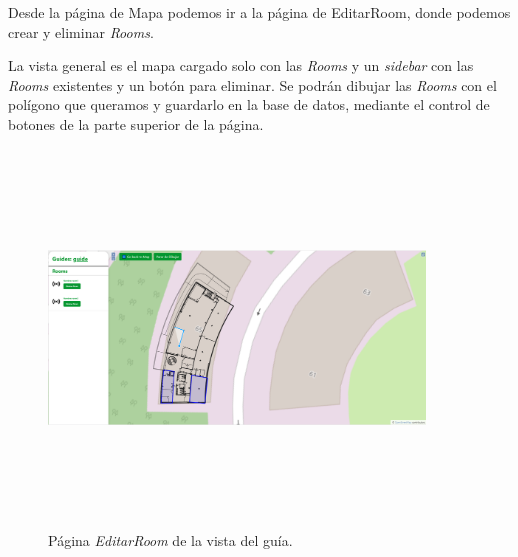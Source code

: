 Desde la página de Mapa podemos ir a la página de EditarRoom, donde podemos crear y eliminar \textit{Rooms}.



La vista general es el mapa cargado solo con las \textit{Rooms} y un \textit{sidebar} con las \textit{Rooms} existentes y un botón para eliminar. Se podrán dibujar las \textit{Rooms} con el polígono que queramos y guardarlo en la base de datos, mediante el control de botones de la parte superior de la página.

\FloatBarrier
\begin{figure}[h]
    \centering
    \includegraphics[width=10cm,height=10cm,keepaspectratio]{img/EditRoom.png}
    \caption{Página \textit{EditarRoom} de la vista del guía.}
    \label{fig:Página Editar Room de la vista del guía}
\end{figure}
\FloatBarrier


